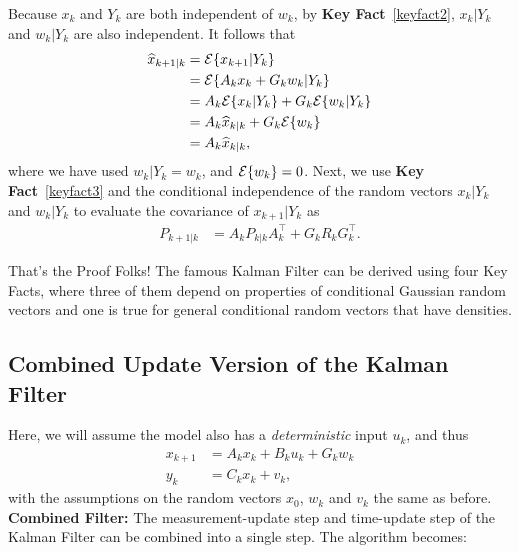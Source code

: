 Because $x_k$ and $Y_k$ are both independent of $w_k$, by \textbf{Key Fact}~\ref{keyfact2}, $x_k| Y_k$ and $w_k | Y_k$ are also independent. It follows that
\begin{align*}
\widehat{x}_{k+1|k}&=    {\cal E} \{ x_{k+1} | Y_k \} \\
& ={\cal E} \{ A_k x_k + G_k w_k | Y_k \} \\
& = A_k {\cal E} \{  x_k | Y_k \}  + G_k  {\cal E} \{  w_k | Y_k \} \\
&=  A_k \widehat{x}_{k|k}  +  G_k {\cal E} \{ w_k \} \\
& = A_k \widehat{x}_{k|k},
\end{align*}
where we have used $w_k | Y_k = w_k$, and ${\cal E} \{ w_k \}=0$. 
Next, we use \textbf{Key Fact}~\ref{keyfact3} and the conditional independence of the random vectors $x_k| Y_k$ and $w_k | Y_k$ to evaluate
the covariance of $x_{k+1}|Y_k$ as
\begin{align*}
P_{k+1|k} &= A_k P_{k|k} A_k^\top  + G_k R_k G_k^\top.
\end{align*}

\begin{mdframed}
 {\Large \bf
\begin{center}
 That's the Proof Folks! The famous Kalman Filter can be derived using four Key Facts, where three of them depend on properties of conditional Gaussian random vectors and one is true for general conditional random vectors that have densities.
\end{center}
}
\end{mdframed}

 
\subsection{Combined Update Version of the Kalman Filter}
\label{sec:combinedUpdateKF}

Here, we will assume the model also has a \textit{deterministic} input $u_k$, and thus
\begin{align*}
x_{k+1} &= A_k x_k + B_k u_k + G_k w_k \\
y_k &= C_k x_k + v_k,
\end{align*}
with the assumptions on the random vectors $x_0$, $w_k$ and $v_k$ the same as before.\\

\textbf{Combined Filter:} The measurement-update step and time-update step of the Kalman Filter can be combined into a single step. The algorithm becomes:\\

